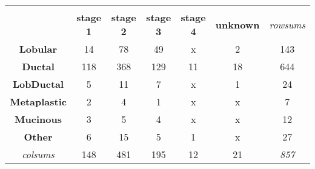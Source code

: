 \begin{table}[!h]
\begin{tabular}{ccccccc}
                \multicolumn{1}{l}{} & \multicolumn{1}{l}{} & \multicolumn{1}{l}{} & \multicolumn{1}{l}{} & \multicolumn{1}{l}{} & \multicolumn{1}{l}{} & \multicolumn{1}{l}{} \\
                \multicolumn{1}{c|}{} & \multicolumn{1}{c|}{\textbf{stage 1}} & \multicolumn{1}{c|}{\textbf{stage 2}} & \multicolumn{1}{c|}{\textbf{stage 3}} & \multicolumn{1}{c|}{\textbf{stage 4}} & \multicolumn{1}{c|}{\textbf{unknown}} & {\color[HTML]{9B9B9B} \textit{rowsums}} \\ \hline
                \multicolumn{1}{c|}{\textbf{Lobular}} & \multicolumn{1}{c|}{14} & \multicolumn{1}{c|}{78} & \multicolumn{1}{c|}{49} & \multicolumn{1}{c|}{{\color[HTML]{656565} x}} & \multicolumn{1}{c|}{2} & \multicolumn{1}{c|}{{\color[HTML]{656565} 143}} \\ \hline
                \multicolumn{1}{c|}{\textbf{Ductal}} & \multicolumn{1}{c|}{118} & \multicolumn{1}{c|}{368} & \multicolumn{1}{c|}{129} & \multicolumn{1}{c|}{11} & \multicolumn{1}{c|}{18} & \multicolumn{1}{c|}{{\color[HTML]{656565} 644}} \\ \hline
                \multicolumn{1}{c|}{\textbf{LobDuctal}} & \multicolumn{1}{c|}{5} & \multicolumn{1}{c|}{11} & \multicolumn{1}{c|}{7} & \multicolumn{1}{c|}{{\color[HTML]{656565} x}} & \multicolumn{1}{c|}{1} & \multicolumn{1}{c|}{{\color[HTML]{656565} 24}} \\ \hline
                \multicolumn{1}{c|}{\textbf{Metaplastic}} & \multicolumn{1}{c|}{2} & \multicolumn{1}{c|}{4} & \multicolumn{1}{c|}{1} & \multicolumn{1}{c|}{{\color[HTML]{656565} x}} & \multicolumn{1}{c|}{{\color[HTML]{656565} x}} & \multicolumn{1}{c|}{{\color[HTML]{656565} 7}} \\ \hline
                \multicolumn{1}{c|}{\textbf{Mucinous}} & \multicolumn{1}{c|}{3} & \multicolumn{1}{c|}{5} & \multicolumn{1}{c|}{4} & \multicolumn{1}{c|}{{\color[HTML]{656565} x}} & \multicolumn{1}{c|}{{\color[HTML]{656565} x}} & \multicolumn{1}{c|}{{\color[HTML]{656565} 12}} \\ \hline
                \multicolumn{1}{c|}{\textbf{Other}} & \multicolumn{1}{c|}{6} & \multicolumn{1}{c|}{15} & \multicolumn{1}{c|}{5} & \multicolumn{1}{c|}{1} & \multicolumn{1}{c|}{{\color[HTML]{656565} x}} & \multicolumn{1}{c|}{{\color[HTML]{656565} 27}} \\ \hline
                \multicolumn{1}{c|}{{\color[HTML]{9B9B9B} \textit{colsums}}} &
                \multicolumn{1}{c|}{{\color[HTML]{656565} 148}} & \multicolumn{1}{c|}{{\color[HTML]{656565} 481}} & \multicolumn{1}{c|}{{\color[HTML]{656565} 195}} & \multicolumn{1}{c|}{{\color[HTML]{656565} 12}} & \multicolumn{1}{c|}{{\color[HTML]{656565} 21}} & \multicolumn{1}{c|}{\textit{857}} \\ \cline{2-7} 
                
                \end{tabular}%
                \end{table}
        

